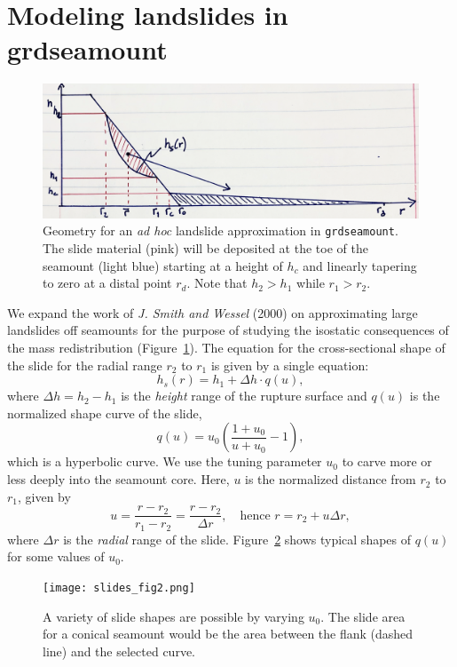 \documentclass[12pt,letterpaper,margin=0.5in]{report}
\begin{document}
\section{Modeling landslides in grdseamount}

\begin{figure}[h!]
  \centering
  \includegraphics[width=5in]{slides_fig1.png}
  \caption{Geometry for an \emph{ad hoc} landslide approximation in \texttt{grdseamount}.  The slide material (pink)
  will be deposited at the toe of the seamount (light blue) starting at a height of $h_c$ and linearly
  tapering to zero at a distal point $r_d$. Note that $h_2 > h_1$ while $r_1 > r_2$.}
  \label{slides_fig1}
\end{figure}

We expand the work of {\it J. Smith and Wessel} (2000) on approximating large landslides off seamounts
for the purpose of studying the isostatic consequences of the mass redistribution (Figure~\ref{slides_fig1}).  The equation for the
cross-sectional shape of the slide for the radial range $r_2$ to $r_1$ is given by a single equation:
\begin{equation}
h_s(r) = h_1 + \Delta h \cdot q(u),
\end{equation}
where $\Delta h = h_2 - h_1$ is the \emph{height} range of the rupture surface and $q(u)$ is the normalized shape curve of the slide,
\begin{equation}
q(u) = u_0 \left (\frac{1 + u_0}{u + u_0} - 1 \right ),
\end{equation}
which is a hyperbolic curve. We use the tuning parameter $u_0$ to carve more or less deeply into the seamount core.
Here, $u$ is the normalized distance from $r_2$ to $r_1$, given by
\begin{equation}
u = \frac{r-r_2}{r_1 - r_2} = \frac{r-r_2}{\Delta r}, \quad \mbox{hence } r = r_2 + u \Delta r,
\end{equation}
where $\Delta r$ is the \emph{radial} range of the slide.
Figure~\ref{slides_fig2} shows typical shapes of $q(u)$ for some values of $u_0$.
\begin{figure}[h!]
  \centering
  \texttt{[image: slides\_fig2.png]}
  \caption{A variety of slide shapes are possible by varying $u_0$.  The slide area for a conical seamount would be the area
  between the flank (dashed line) and the selected curve.}
  \label{slides_fig2}
\end{figure}
\end{document}
